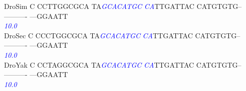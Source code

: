 \documentclass[11pt,twoside,reqno,a4paper]{article}
\begin{document}
{DroSim	C	CCTTGGCGCA	TA\textit{\textcolor{Blue}{G}}\textit{\textcolor{Blue}{C}}\textit{\textcolor{Blue}{A}}\textit{\textcolor{Blue}{C}}\textit{\textcolor{Blue}{A}}\textit{\textcolor{Blue}{T}}\textit{\textcolor{Blue}{G}}\textit{\textcolor{Blue}{C}}	\textit{\textcolor{Blue}{C}}\textit{\textcolor{Blue}{A}}TTGATTAC	CATGTGTG--	----------	---GGAATT\\
\hspace*{7\charwidth}\hspace*{1\charwidth}\hspace*{1\charwidth}\hspace*{13\charwidth}\textit{\textcolor{Blue}{10.0}}\hspace*{1\charwidth}\hspace*{1\charwidth}\hspace*{1\charwidth}\hspace*{1\charwidth}\\
DroSec	C	CCCTGGCGCA	TA\textit{\textcolor{Blue}{G}}\textit{\textcolor{Blue}{C}}\textit{\textcolor{Blue}{A}}\textit{\textcolor{Blue}{C}}\textit{\textcolor{Blue}{A}}\textit{\textcolor{Blue}{T}}\textit{\textcolor{Blue}{G}}\textit{\textcolor{Blue}{C}}	\textit{\textcolor{Blue}{C}}\textit{\textcolor{Blue}{A}}TTGATTAC	CATGTGTG--	----------	---GGAATT\\
\hspace*{7\charwidth}\hspace*{1\charwidth}\hspace*{1\charwidth}\hspace*{13\charwidth}\textit{\textcolor{Blue}{10.0}}\hspace*{1\charwidth}\hspace*{1\charwidth}\hspace*{1\charwidth}\hspace*{1\charwidth}\\
DroYak	C	CCTAGGCGCA	TA\textit{\textcolor{Blue}{G}}\textit{\textcolor{Blue}{C}}\textit{\textcolor{Blue}{A}}\textit{\textcolor{Blue}{C}}\textit{\textcolor{Blue}{A}}\textit{\textcolor{Blue}{T}}\textit{\textcolor{Blue}{G}}\textit{\textcolor{Blue}{C}}	\textit{\textcolor{Blue}{C}}\textit{\textcolor{Blue}{A}}TTGATTAC	CATGTGTG--	----------	---GGAATT\\
\hspace*{7\charwidth}\hspace*{1\charwidth}\hspace*{1\charwidth}\hspace*{13\charwidth}\textit{\textcolor{Blue}{10.0}}\hspace*{1\charwidth}\hspace*{1\charwidth}\hspace*{1\charwidth}\hspace*{1\charwidth}\\
}
\end{document}
